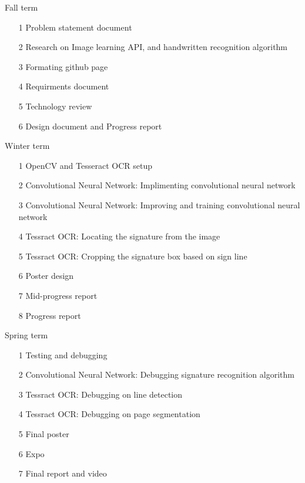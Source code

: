 \documentclass[article, onecolumn, draftclsnofoot,10pt, compsoc]{IEEEtran}
\begin{document}
\begin{description}
	\item Fall term
	\begin{itemize}
        \item[1] Problem statement document
		\item[2] Research on Image learning API, and handwritten recognition algorithm
		\item[3] Formating github page
		\item[4] Requirments document
		\item[5] Technology review
		\item[6] Design document and Progress report
    \end{itemize}
	\item Winter term
	\begin{itemize}
        \item[1] OpenCV and Tesseract OCR setup
		\item[2] Convolutional Neural Network: Implimenting convolutional neural network
		\item[3] Convolutional Neural Network: Improving and training convolutional neural network
		\item[4] Tessract OCR: Locating the signature from the image
		\item[5] Tessract OCR: Cropping the signature box based on sign line
		\item[6] Poster design
		\item[7] Mid-progress report
		\item[8] Progress report
    \end{itemize}
	\item Spring term
	\begin{itemize}
        \item[1] Testing and debugging
		\item[2] Convolutional Neural Network: Debugging signature recognition algorithm
		\item[3] Tessract OCR: Debugging on line detection
		\item[4] Tessract OCR: Debugging on page segmentation
		\item[5] Final poster
		\item[6] Expo
		\item[7] Final report and video
    \end{itemize}
\end{description}
\end{document}
